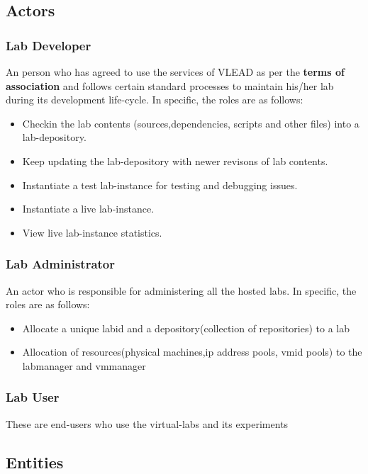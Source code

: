 \documentclass[11pt]{article}
\begin{document}
\subsection{Actors}
\label{sec-3.2}

\subsubsection{Lab Developer}
\label{sec-3.2.1}

   An person who has agreed to use the services of VLEAD as per the
   \textbf{terms of association} and follows certain standard processes to
   maintain his/her lab during its development life-cycle. In
   specific, the roles are as follows:
\begin{itemize}
\item Checkin the lab contents (sources,dependencies, scripts and other files) into a lab-depository.
\item Keep updating the lab-depository with newer revisons of lab contents.
\item Instantiate a test lab-instance for testing and debugging issues.
\item Instantiate a live lab-instance.
\item View live lab-instance statistics.
\end{itemize}
\subsubsection{Lab Administrator}
\label{sec-3.2.2}

   An actor who is responsible for administering all the hosted
   labs. In specific, the roles are as follows:
\begin{itemize}
\item Allocate a unique labid and a depository(collection of
       repositories) to a lab
\item Allocation of resources(physical machines,ip address pools,
       vmid pools) to the labmanager and vmmanager
\end{itemize}
\subsubsection{Lab User}
\label{sec-3.2.3}

   These are end-users who use the virtual-labs and its experiments
\subsection{Entities}
\label{sec-3.3}
\end{document}
